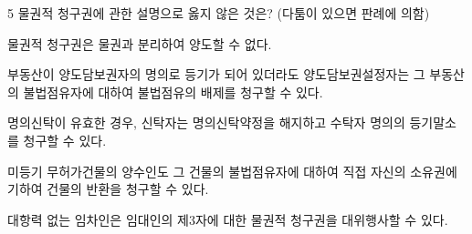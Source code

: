 \begin{question}{5}
물권적 청구권에 관한 설명으로 옳지 않은 것은? (다툼이 있으면 판례에 의함)
\begin{choices}
  \item 물권적 청구권은 물권과 분리하여 양도할 수 없다.
  \item 부동산이 양도담보권자의 명의로 등기가 되어 있더라도 양도담보권설정자는 그 부동산의 불법점유자에 대하여 불법점유의 배제를 청구할 수 있다.
  \item 명의신탁이 유효한 경우, 신탁자는 명의신탁약정을 해지하고 수탁자 명의의 등기말소를 청구할 수 있다.
  \item 미등기 무허가건물의 양수인도 그 건물의 불법점유자에 대하여 직접 자신의 소유권에 기하여 건물의 반환을 청구할 수 있다.
  \item 대항력 없는 임차인은 임대인의 제3자에 대한 물권적 청구권을 대위행사할 수 있다.
\end{choices}
\end{question}
